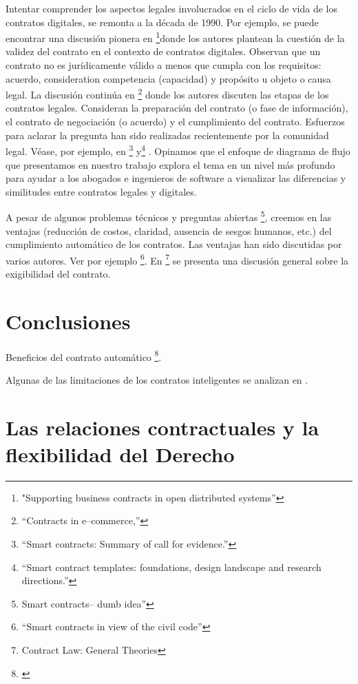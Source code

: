 \documentclass[12pt]{report} %
\begin{document}
\begin{itemize}
{Intentar comprender los aspectos legales involucrados en el ciclo de vida de los contratos digitales, se remonta a la década de 1990. Por ejemplo, se puede encontrar una discusión pionera en  \footnote{\cite{Zoran1995} "Supporting business contracts in open distributed systems” }}donde los autores plantean la cuestión de la validez del contrato en el contexto de contratos digitales. Observan que un contrato no es jurídicamente válido a menos que cumpla con los requisitos: acuerdo, consideration  competencia (capacidad) y propósito u objeto o causa legal. La discusión continúa en \footnote{\cite{HansLai2003} “Contracts in e–commerce,” } donde los autores discuten las etapas de los contratos legales. Consideran la preparación del contrato (o fase de información), el contrato de negociación (o acuerdo) y el cumplimiento del contrato. Esfuerzos para aclarar la pregunta han sido realizadas recientemente por la comunidad legal. Véase, por ejemplo, en \footnote{\cite{LawCommission2020} “Smart contracts: Summary of call for evidence.” } y\footnote{\cite{Christopher2019}“Smart contract templates: foundations, design landscape and research directions.” }  . Opinamos que el enfoque de diagrama de flujo que presentamos en nuestro trabajo explora el tema en un nivel más profundo para ayudar a los abogados e ingenieros de software a visualizar las diferencias y similitudes entre contratos legales y digitales.

A pesar de algunos problemas técnicos y preguntas abiertas \footnote{\cite{Kieron2017}Smart contracts– dumb idea” }, creemos en las ventajas (reducción de costos, claridad, ausencia de sesgos humanos, etc.) del cumplimiento automático de los contratos. Las ventajas han sido discutidas por varios autores. Ver por ejemplo \footnote{\cite{Monika2019} “Smart contracts in view of the civil code”}. En \footnote{\cite{RichardCraswell1999} Contract Law: General Theories} se presenta una discusión general sobre la exigibilidad del contrato.

\section{Conclusiones}

Beneficios del contrato automático \footnote{\cite{Monika2019}}.

Algunas de las limitaciones de los contratos inteligentes se analizan en .


\section{Las relaciones contractuales y la flexibilidad del Derecho}


\end{itemize}
\end{document}
